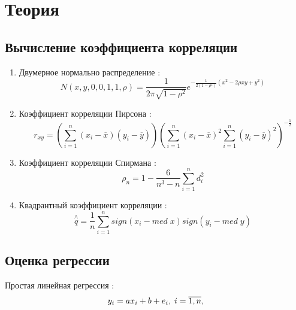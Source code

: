 \documentclass[a4]{article}
\begin{document}
	\section{Теория} %
	\subsection{Вычисление коэффициента корреляции} %
	\label{sub:вычисление_коэффициента_корреляции}
	\begin{enumerate}
	    \item Двумерное нормально распределение \cite{5_1}:
	        \begin{equation}
	        N(x,y,0,0,1,1,\rho) = \frac{1}{2\pi\sqrt{1-\rho^2}}e^{-\frac{1}{2(1-\rho^2)}(x^2-2\rho x y+y^2)} \label{dnd}
	        \end{equation}
	    
	    \item Коэффициент корреляции Пирсона \cite{5_2}:
	        \begin{equation}
	        r_{xy} = \left(\sum\limits_{i=1}^n(x_i-\overline{x})(y_i-\overline{y})\right)\left(\sum\limits_{i=1}^n(x_i-\overline{x})^2\sum\limits_{i=1}^n(y_i-\overline{y})^2\right)^{-\frac{1}{2}} \label{ccp}
	        \end{equation}
	    \item Коэффициент корреляции Спирмана \cite{5_3}:
	        \begin{equation}
	        \rho_n = 1 -  \frac{6}{n^3-n}\sum\limits_{i=1}^n d_i^2\label{ccs}
	        \end{equation}
	        
	    \item Квадрантный коэффициент корреляции \cite{5_4}:
	        \begin{equation}
	        \overset{\wedge}{q} = \frac{1}{n}\sum\limits_{i=1}^n sign(x_i-med\;x)sign(y_i-med\;y)\label{qcc}
	        \end{equation}
	\end{enumerate}
	\subsection{Оценка регрессии} %
	\label{sub:оценка_регрессии}
	Простая линейная регрессия \cite{lin_reg}:
	\begin{equation}
	    y_i=ax_i+b+e_i,\;i=\overline{1,n},\hfill
	\end{equation}
\end{document}
